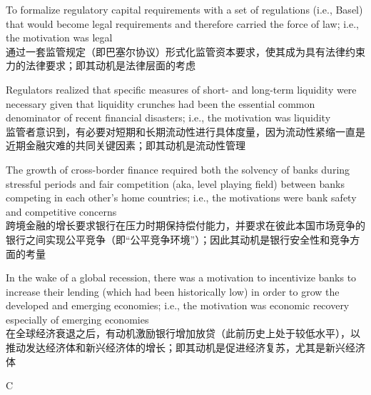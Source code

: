 \documentclass{article}
\begin{document}
\begin{choices}
    \item To formalize regulatory capital requirements with a set of regulations (i.e., Basel) that would become legal requirements and therefore carried the force of law; i.e., the motivation was legal\\
    通过一套监管规定（即巴塞尔协议）形式化监管资本要求，使其成为具有法律约束力的法律要求；即其动机是法律层面的考虑
    \item Regulators realized that specific measures of short- and long-term liquidity were necessary given that liquidity crunches had been the essential common denominator of recent financial disasters; i.e., the motivation was liquidity\\
    监管者意识到，有必要对短期和长期流动性进行具体度量，因为流动性紧缩一直是近期金融灾难的共同关键因素；即其动机是流动性管理
    \item The growth of cross-border finance required both the solvency of banks during stressful periods and fair competition (aka, level playing field) between banks competing in each other's home countries; i.e., the motivations were bank safety and competitive concerns\\
    跨境金融的增长要求银行在压力时期保持偿付能力，并要求在彼此本国市场竞争的银行之间实现公平竞争（即“公平竞争环境”）；因此其动机是银行安全性和竞争方面的考量
    \item In the wake of a global recession, there was a motivation to incentivize banks to increase their lending (which had been historically low) in order to grow the developed and emerging economies; i.e., the motivation was economic recovery especially of emerging economies\\
    在全球经济衰退之后，有动机激励银行增加放贷（此前历史上处于较低水平），以推动发达经济体和新兴经济体的增长；即其动机是促进经济复苏，尤其是新兴经济体
\end{choices}

\begin{correctanswer}
    C
\end{correctanswer}
\end{document}

